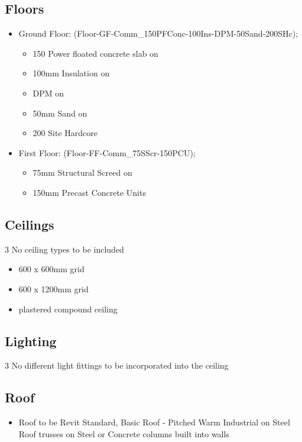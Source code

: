 \subsection*{Floors}
\begin{itemize}
	\item Ground Floor: (Floor-GF-Comm\_150PFConc-100Ins-DPM-50Sand-200SHc);
	\begin{itemize}
		\item 150 Power floated concrete slab on
		\item 100mm Insulation on
		\item DPM on 
		\item 50mm Sand on 
		\item 200 Site Hardcore
	\end{itemize}   
	\item First Floor: (Floor-FF-Comm\_75SScr-150PCU);
	\begin{itemize}
		\item 75mm Structural Screed on 
		\item 150mm Precast Concrete Units
	\end{itemize} 
\end{itemize}


\subsection*{Ceilings}
3 No ceiling types to be included
\begin{itemize}
	\item 600 x 600mm grid
	\item 600 x 1200mm grid
	\item plastered compound ceiling
\end{itemize}



\subsection*{Lighting}
3 No different light fittings to be incorporated into the ceiling


\subsection*{Roof}
\begin{itemize}
	\item Roof to be Revit Standard, Basic Roof - Pitched Warm Industrial on Steel Roof trusses on Steel or Concrete columns built into walls
\end{itemize}


